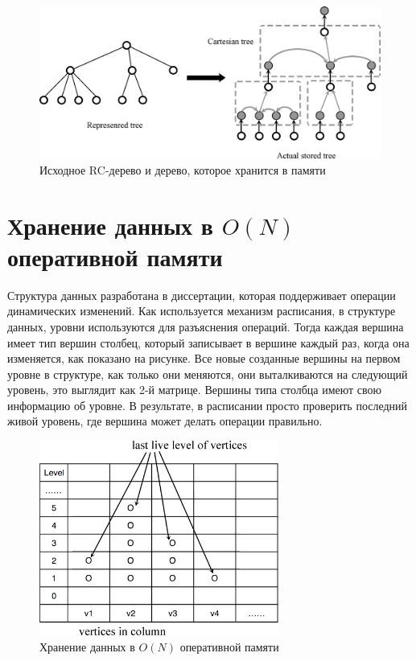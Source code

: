 \documentclass[specification,annotation]{itmo-student-thesis}
\newcommand{\revise}[1]{{\color{red!70!black} #1 }}
\begin{document}
\begin{figure}[!ht]
\centering
\includegraphics[width=1.0\textwidth]{pic/represented_tree_and_actual_stored_tree.png}
\caption{Исходное RC-дерево и дерево, которое хранится в памяти}\label{fig:represented}
\end{figure}


\section{Хранение данных в $O(N)$ оперативной памяти}

\revise{
Структура данных разработана в диссертации, которая поддерживает операции динамических изменений. Как используется механизм расписания, в структуре данных, уровни используются для разъяснения операций. 
Тогда каждая вершина имеет тип вершин столбец, который записывает в вершине каждый раз, когда она изменяется, как показано на рисунке. Все новые созданные вершины на первом уровне в структуре, как только 
они меняются, они выталкиваются на следующий уровень, это выглядит как 2-й матрице. Вершины типа столбца имеют свою информацию об уровне. В результате, в расписании просто проверить последний живой 
уровень, где вершина может делать операции правильно.
}

\begin{figure}[!ht]
\centering
\includegraphics[width=0.7\textwidth]{pic/vertices_in_column.png}
\caption{Хранение данных в $O(N)$ оперативной памяти}\label{fig:memory}
\end{figure}
\end{document}
